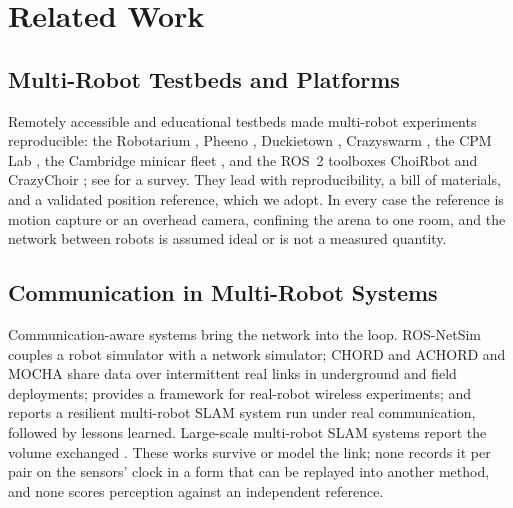 \documentclass[journal]{IEEEtran}
\begin{document}
\section{Related Work}
\label{sec:related}

\subsection{Multi-Robot Testbeds and Platforms}
Remotely accessible and educational testbeds made multi-robot
experiments reproducible: the Robotarium
\cite{pickem2017robotarium,wilson2021robotarium}, Pheeno
\cite{wilson2016pheeno}, Duckietown \cite{paull2017duckietown},
Crazyswarm \cite{preiss2017crazyswarm}, the CPM Lab
\cite{kloock2021cpmlab}, the Cambridge minicar fleet
\cite{hyldmar2019fleet}, and the ROS~2 toolboxes ChoiRbot
\cite{testa2021choirbot} and CrazyChoir \cite{pichierri2023crazychoir};
see \cite{mokhtarian2025survey} for a survey. They lead with
reproducibility, a bill of materials, and a validated position
reference, which we adopt. In every case the reference is motion
capture or an overhead camera, confining the arena to one room, and
the network between robots is assumed ideal or is not a measured
quantity.

\subsection{Communication in Multi-Robot Systems}
Communication-aware systems bring the network into the loop.
ROS-NetSim \cite{calvofullana2021rosnetsim} couples a robot simulator
with a network simulator; CHORD and ACHORD
\cite{ginting2021chord,saboia2022achord} and MOCHA
\cite{cladera2024mocha} share data over intermittent real links in
underground and field deployments; \cite{blumenkamp2022framework}
provides a framework for real-robot wireless experiments; and
\cite{tian2023resilient} reports a resilient multi-robot SLAM system
run under real communication, followed by lessons learned. Large-scale
multi-robot SLAM systems report the volume exchanged
\cite{chang2022lamp2,swarmslam,doorslam}. These works survive or model
the link; none records it per pair on the sensors' clock in a form
that can be replayed into another method, and none scores perception
against an independent reference.
\end{document}
